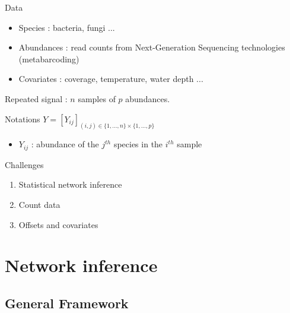 \documentclass{beamer}
\newcommand{\emphase}[1]{\textcolor{Complement}{#1}}
\begin{document}
\begin{frame}{Data}
	\begin{itemize}
	\item \emphase{Species} : bacteria, fungi ...
	\item \emphase{Abundances} : read counts from Next-Generation Sequencing technologies (metabarcoding)
	\item \emphase{Covariates} : coverage, temperature, water depth ... 
\end{itemize}
	Repeated signal : $n$ samples of $p$ abundances.
\begin{block}{Notations}
	$Y = [Y_{ij}]_{(i,j) \in \{1,...,n\} \times \{1,..., p\}} $
	\begin{itemize}
	\item $Y_{ij}$ : abundance of the $j^{th}$ species in the $i^{th}$ sample
\end{itemize}
\end{block}
\begin{center}
	\color{Nicered}{Infer the species interaction network from $Y$}
\end{center}
\end{frame}
\begin{frame}{Challenges}\large{
	\begin{enumerate}
	\item  Statistical network inference \bigskip\bigskip
	\item Count data \bigskip\bigskip
	\item Offsets and covariates
\end{enumerate}}
\end{frame}

\section{Network inference}
\subsection{General Framework}
\end{document}
